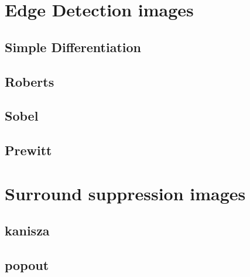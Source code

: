 \documentclass[10pt,a4paper]{article}
\begin{document}
\section{Edge Detection images}
\subsection{Simple Differentiation}



\subsection{Roberts}



\subsection{Sobel}



\subsection{Prewitt}



\section{Surround suppression images}
\subsection{kanisza}





\subsection{popout}


\end{document}
